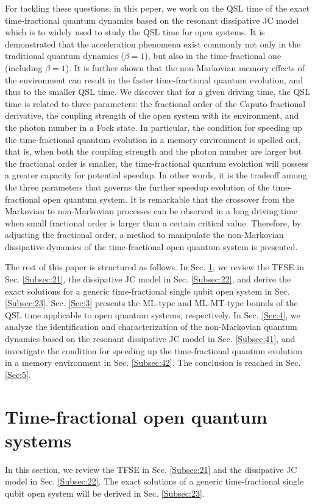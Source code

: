 \documentclass[
showpacs,  %
showkeys,  %
aps,       %
amsthm,    %
amsmath,   %
amsfonts,  %
amssymb    %
]{revtex4-1}          %
\begin{document}
For tackling these questions, in this peper, we work on the QSL time of the exact time-fractional quantum dynamics based on the resonant dissipative JC model which is to widely used to study the QSL time for open systems. It is demonstrated that the acceleration phenomena exist commonly not only in the traditional quantum dynamics ($\beta=1$), but also in the time-fractional one (including $\beta=1$). It is further shown that the non-Markovian memory effects of the environment can result in the faster time-fractional quantum evolution, and thus to the smaller QSL time. We discover that for a given driving time, the QSL time is related to three parameters: the fractional order of the Caputo fractional derivative, the coupling strength of the open system with its environment, and the photon number in a Fock state. In particular, the condition for speeding up the time-fractional quantum evolution in a memory environment is spelled out, that is, when both the coupling strength and the photon number are larger but the fractional order is smaller, the time-fractional quantum evolution will possess a greater capacity for potential speedup. In other words, it is the tradeoff among the three parameters that governs the further speedup evolution of the time-fractional open quantum system. It is remarkable that the crossover from the Markovian to non-Markovian processes can be observed in a long driving time when small fractional order is larger than a certain critical value. Therefore, by adjusting the fractional order, a method to manipulate the non-Markovian dissipative dynamics of the time-fractional open quantum system is presented.

The rest of this paper is structured as follows. In Sec. \ref{Sec:2}, we review the TFSE in Sec. \ref{Subsec:21}, the dissipative JC model in Sec. \ref{Subsec:22}, and derive the exact solutions for a generic time-fractional single qubit open system in Sec. \ref{Subsec:23}. Sec. \ref{Sec:3} presents the ML-type and ML-MT-type bounds of the QSL time applicable to open quantum systems, respectively. In Sec. \ref{Sec:4}, we analyze the identification and characterization of the non-Markovian quantum dynamics based on the resonant dissipative JC model in Sec. \ref{Subsec:41}, and investigate the condition for speeding up the time-fractional quantum evolution in a memory environment in Sec. \ref{Subsec:42}. The conclusion is reached in Sec. \ref{Sec:5}.



\section{Time-fractional open quantum systems}
\label{Sec:2}
In this section, we review the TFSE in Sec. \ref{Subsec:21} and the dissipative JC model in Sec. \ref{Subsec:22}. The exact solutions of a generic time-fractional single qubit open system will be derived in Sec. \ref{Subsec:23}.
\end{document}
